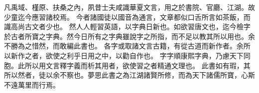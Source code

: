 凡禹域、槿原、扶桑之內，夙昔士夫咸識華夏文言，用之於書院、官廳、江湖。故少童迄今應習諸校焉。
今者諸國徒以國音為通言，文章都似口舌所言如茶飯，而識高尚古文者少也。
然人人輕習英語，以字典日新也。如欲習唐文也，迄今檢字於古者所寶之字典。然今日所有之字典雖說字之所指，而不足以教其所以用也。余不勝為之惜然，而敢編此書也。
各字或取諸文言古籍，有從古道而新作者。余所以新作之者，欲使之利乎日用之中，以勸自作也。
字字順康熙字典，乃慮天下同胞。此所以用文言釋字義而析其用者，欲使習之者精通文理也。
此書如有瑕，其所以然者，徒以余不察也。夢思此書之為江湖諸賢所修，而為天下諸儒所寶，心斯不遠萬里而行焉。
